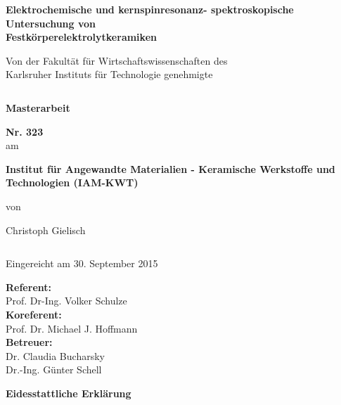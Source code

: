 \documentclass[a4paper, 11pt, headsepline,footsepline,twoside,abstract]{scrbook}
\begin{document}
\begin{center}
\textbf{\huge{ Elektrochemische und kern\-spin\-resonanz- spek\-tros\-ko\-pische Untersuchung von\\[0.4cm]Festkörperelektrolytkeramiken}}
\end{center}
\begin{center}
\textbf{\Large{}}
\end{center}
\begin{center}
\large{Von der Fakultät für Wirtschaftswissenschaften des \\ Karlsruher Instituts für Technologie genehmigte }
\end{center}
\begin{verbatim}

\end{verbatim}
\begin{center}
\textbf{\LARGE{Masterarbeit}}
\end{center}
\begin{center}
\textbf{\Large{Nr. 323}}\\
am
\end{center}
\begin{center}
\textbf{\Large{Institut für Angewandte Materialien - Keramische Werkstoffe und Technologien (IAM-KWT)}}
\end{center}
\begin{center}
von
\end{center}
\begin{center}
\Large{Christoph Gielisch}
\end{center}
\begin{verbatim}
\end{verbatim}
\begin{center}
Eingereicht am 30. September 2015
\end{center}
\begin{center}
\textbf{Referent:} \\ Prof. Dr-Ing. Volker Schulze \\
\textbf{Koreferent:} \\ Prof. Dr. Michael J. Hoffmann\\
\textbf{Betreuer:} \\ Dr. Claudia Bucharsky \\ 
Dr.-Ing. Günter Schell \\
\end{center}
\newpage
\cleardoubleemptypage
\setcounter{page}{1}
\textbf{\Large{Eidesstattliche Erklärung}}
\\\\
\end{document}
